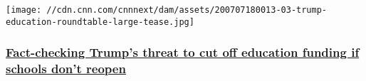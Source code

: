 \begin{itemize}
  \texttt{[image: //cdn.cnn.com/cnnnext/dam/assets/200707180013-03-trump-education-roundtable-large-tease.jpg]}

  \hypertarget{fact-checking-trumps-threat-to-cut-off-education-funding-if-schools-dont-reopen}{%
  \subsubsection{\texorpdfstring{\href{/2020/07/08/politics/donald-trump-threat-to-cut-school-funding-fact-check/index.html}{Fact-checking
  Trump's threat to cut off education funding if schools don't
  reopen}}{Fact-checking Trump's threat to cut off education funding if schools don't reopen}}\label{fact-checking-trumps-threat-to-cut-off-education-funding-if-schools-dont-reopen}}
\end{itemize}

